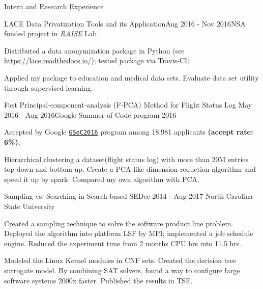 \documentclass{resume} %
\begin{document}
\begin{rSection}{Intern and Research Experience}
\begin{rSubsection}{LACE Data Privatization Tools and its Application}{Aug 2016 - Nov 2016}{NSA funded project in \href{http://ai4se.net/index}{\textit{RAISE}} Lab}{}

\item Distributed a data anonymization  package in Python (see \url{https://lace.readthedocs.io/}); tested package via Travis-CI;
\item Applied my package to education and medical data sets. Evaluate data set utility through supervised learning.
\end{rSubsection}


\begin{rSubsection}{Fast Principal-component-analysis (F-PCA) Method for Flight Status Log} {May 2016 - Aug 2016}{Google Summer of Code program 2016}{}
\item Accepted by Google \href{https://developers.google.com/open-source/gsoc/}{\texttt{GSoC2016}}  program among 18,981 applicants \textbf{(accept rate: 6\%)};
\item Hierarchical clustering a dataset(flight status log) with more than 20M entries top-down and bottom-up. Create a PCA-like dimension reduction algorithm and speed it up by spark. Compared my own algorithm with PCA.
\end{rSubsection}  

\begin{rSubsection}{Sampling vs. Searching in Search-based SE}{Dec 2014 - Aug 2017}
{North Carolina State University}{}
\item Created a sampling technique to solve the software product line problem. Deployed the algorithm into platform LSF by MPI; implemented a job schedule engine. Reduced the experiment time from 2 months CPU hrs into 11.5 hrs.
\item Modeled the Linux Kernel modules in CNF sets. Created the decision tree surrogate model. By combining SAT solvers, found a way to configure large software systems 2000x faster. Published the results in TSE.
\end{rSubsection}



\end{rSection}
\end{document}
